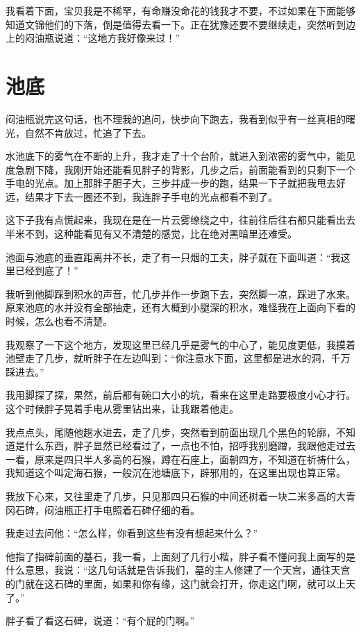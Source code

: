 我看着下面，宝贝我是不稀罕，有命赚没命花的钱我才不要，不过如果在下面能够知道文锦他们的下落，倒是值得去看一下。正在犹豫还要不要继续走，突然听到边上的闷油瓶说道：“这地方我好像来过！”

\chapter{池底}

闷油瓶说完这句话，也不理我的追问，快步向下跑去，我看到似乎有一丝真相的曙光，自然不肯放过，忙追了下去。

水池底下的雾气在不断的上升，我才走了十个台阶，就进入到浓密的雾气中，能见度急剧下降，我刚开始还能看见胖子的背影，几步之后，前面能看到的只剩下一个手电的光点。加上那胖子胆子大，三步并成一步的跑，结果一下子就把我甩去好远，结果才下去一圈还不到，我连胖子手电的光点都看不到了。

这下子我有点慌起来，我现在是在一片云雾缭绕之中，往前往后往右都只能看出去半米不到，这种能看见有又不清楚的感觉，比在绝对黑暗里还难受。

池面与池底的垂直距离并不长，走了有一只烟的工夫，胖子就在下面叫道：“我这里已经到底了！”

我听到他脚踩到积水的声音，忙几步并作一步跑下去，突然脚一凉，踩进了水来。原来池底的水并没有全部抽走，还有大概到小腿深的积水，难怪我在上面向下看的时候，怎么也看不清楚。

我观察了一下这个地方，发现这里已经几乎是雾气的中心了，能见度更低，我摸着池壁走了几步，就听胖子在左边叫到：“你注意水下面，这里都是进水的洞，千万踩进去。”

我用脚探了探，果然，前后都有碗口大小的坑，看来在这里走路要极度小心才行。这个时候胖子晃着手电从雾里钻出来，让我跟着他走。

我点点头，尾随他趟水进去，走了几步，突然看到前面出现几个黑色的轮廓，不知道是什么东西，胖子显然已经看过了，一点也不怕，招呼我别磨蹭，我跟他走过去一看，原来是四只半人多高的石猴，蹲在石座上，面朝四方，不知道在祈祷什么，我知道这个叫定海石猴，一般沉在池塘底下，辟邪用的，在这里出现也算正常。

我放下心来，又往里走了几步，只见那四只石猴的中间还树着一块二米多高的大青冈石碑，闷油瓶正打手电照着石碑仔细的看。

我走过去问他：“怎么样，你看到这些有没有想起来什么？”

他指了指碑前面的基石，我一看，上面刻了几行小楷，胖子看不懂问我上面写的是什么意思，我说：“这几句话就是告诉我们，墓的主人修建了一个天宫，通往天宫的门就在这石碑的里面，如果和你有缘，这门就会打开，你走这门啊，就可以上天了。”

胖子看了看这石碑，说道：“有个屁的门啊。”

